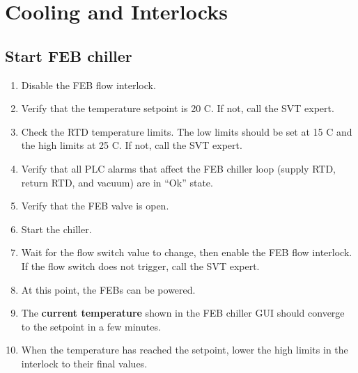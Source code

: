 \section{Cooling and Interlocks}
\label{sec:proc_cooling}
\subsection{Start FEB chiller}
\begin{enumerate}
    \item Disable the FEB flow interlock.
    \item Verify that the temperature setpoint is 20 C. If not, call the SVT expert.
    \item Check the RTD temperature limits. The low limits should be set at 15 C and the high limits at 25 C. If not, call the SVT expert.
    \item Verify that all PLC alarms that affect the FEB chiller loop (supply RTD, return RTD, and vacuum) are in ``Ok'' state.
    \item Verify that the FEB valve is open.
    \item Start the chiller.
    \item Wait for the flow switch value to change, then enable the FEB flow interlock.
        If the flow switch does not trigger, call the SVT expert.
    \item At this point, the FEBs can be powered.
    \item The \textbf{current temperature} shown in the FEB chiller GUI should converge to the setpoint in a few minutes.
    \item When the temperature has reached the setpoint, lower the high limits in the interlock to their final values.
\end{enumerate}

